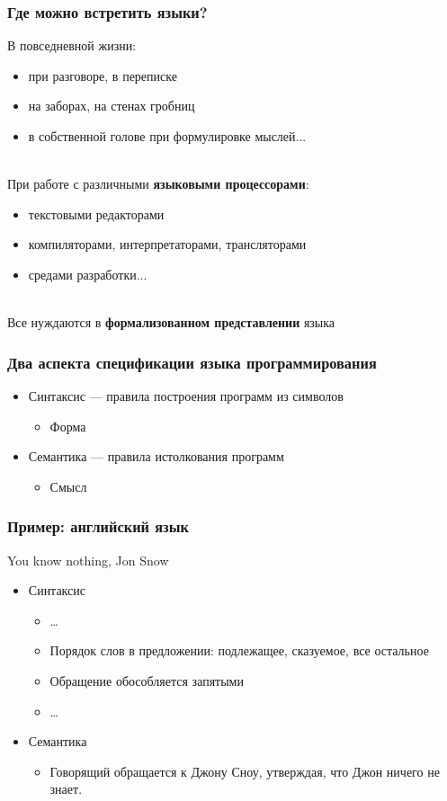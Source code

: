 \documentclass{beamer}
\begin{document}
\begin{frame}[fragile]
  \transwipe[direction=90]
  \frametitle{Где можно встретить языки?}
  В повседневной жизни: 
  \begin{itemize} 
    \item при разговоре, в переписке
    \item на заборах, на стенах гробниц
    \item в собственной голове при формулировке мыслей... 
  \end{itemize} 
\pause ~\\  
  При работе с различными \textbf{языковыми процессорами}:
  \begin{itemize}
    \item текстовыми редакторами
    \item компиляторами, интерпретаторами, трансляторами
    \item средами разработки...
  \end{itemize}
\pause ~\\
  Все нуждаются в \textbf{формализованном представлении} языка
\end{frame}

\begin{frame}[fragile]
  \transwipe[direction=90]
  \frametitle{Два аспекта спецификации языка программирования}
  \begin{itemize}
    \item Синтаксис --- правила построения программ из символов
    \begin{itemize}
      \item Форма
    \end{itemize}
    \item Семантика --- правила истолкования программ
    \begin{itemize}
      \item Смысл
    \end{itemize}
  \end{itemize}
\end{frame}

\begin{frame}[fragile]
  \transwipe[direction=90]
  \frametitle{Пример: английский язык}
  You know nothing, Jon Snow
  \begin{itemize}
    \item Синтаксис
    \begin{itemize}
      \item \dots
      \item Порядок слов в предложении: подлежащее, сказуемое, все остальное
      \item Обращение обособляется запятыми
      \item \dots
    \end{itemize}
    \item Семантика
    \begin{itemize}
      \item Говорящий обращается к Джону Сноу, утверждая, что Джон ничего не знает. 
    \end{itemize}
  \end{itemize}
\end{frame}
\end{document}
